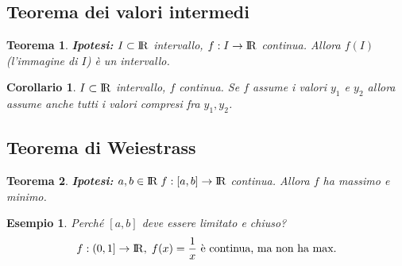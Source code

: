 \documentclass[12pt, a4paper]{article}
\theoremstyle{break}
\newtheorem{theorem}{Teorema}[subsection]
\newtheorem{corollary}{Corollario}[theorem]
\newtheorem{example}{Esempio}[subsection]
\newcommand\R{{\rm I\!R}}
\begin{document}
    \subsection{Teorema dei valori intermedi}
    \begin{theorem}
        \textbf{Ipotesi:} $I\subset\R$ intervallo, $f:I\rightarrow\R$ continua.\newline
        Allora $f(I)$ (l'immagine di $I$) è un intervallo.
    \end{theorem}
    \begin{corollary}
        $I\subset\R$ intervallo, $f$ continua.\newline 
        Se $f$ assume i valori $y_1$ e $y_2$ allora assume anche tutti i valori compresi fra $y_1,y_2$.
    \end{corollary}
    \subsection{Teorema di Weiestrass}
    \begin{theorem}
        \textbf{Ipotesi:} $a,b\in\R\;f:[a,b]\rightarrow\R$ continua.\newline
        Allora $f$ ha massimo e minimo.
    \end{theorem}
    \begin{example}
        Perché $[a,b]$ deve essere limitato e chiuso?
        \[f:(0,1]\rightarrow\R,\;f(x)=\frac{1}{x}\text{ è continua, ma non ha max.}\]
        \begin{figure}[!htb]
            \centering
        \end{figure}
    \end{example}
    \newpage
\end{document}
